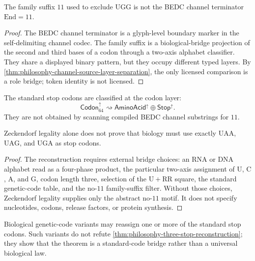 \begin{theorem}
\label{thm:philosophy-zstop-no-channel-token-collapse}
The family suffix $11$ used to exclude $\mathrm{UGG}$ is not the BEDC
channel terminator $\mathrm{End}=11$.
\end{theorem}
\begin{proof}
The BEDC channel terminator is a glyph-level boundary marker in the
self-delimiting channel codec. The family suffix is a biological-bridge
projection of the second and third bases of a codon through a two-axis
alphabet classifier. They share a displayed binary pattern, but they
occupy different typed layers. By
\autoref{thm:philosophy-channel-source-layer-separation}, the only
licensed comparison is a role bridge; token identity is not licensed.
\end{proof}

\begin{corollary}
\label{cor:philosophy-stop-codons-classifier-level}
The standard stop codons are classified at the codon layer:
$$
  \mathsf{Codon}_{64}^{\uparrow}
  \rightsquigarrow
  \mathsf{AminoAcid}^{\uparrow}\oplus\mathsf{Stop}^{\uparrow}.
$$
They are not obtained by scanning compiled BEDC channel substrings for
$11$.
\end{corollary}

\begin{theorem}
\label{thm:philosophy-zeckendorf-not-biological-necessity}
Zeckendorf legality alone does not prove that biology must use exactly
$\mathrm{UAA}$, $\mathrm{UAG}$, and $\mathrm{UGA}$ as stop codons.
\end{theorem}
\begin{proof}
The reconstruction requires external bridge choices: an RNA or DNA
alphabet read as a four-phase product, the particular two-axis
assignment of $\mathrm{U}$, $\mathrm{C}$, $\mathrm{A}$, and
$\mathrm{G}$, codon length three, selection of the
$\mathrm{U}+\mathrm{RR}$ square, the standard genetic-code table, and
the no-$11$ family-suffix filter. Without those choices, Zeckendorf
legality supplies only the abstract no-$11$ motif. It does not specify
nucleotides, codons, release factors, or protein synthesis.
\end{proof}

\begin{corollary}
\label{cor:philosophy-variant-codes-remain-targets}
Biological genetic-code variants may reassign one or more of the
standard stop codons. Such variants do not refute
\autoref{thm:philosophy-three-stop-reconstruction}; they show that the
theorem is a standard-code bridge rather than a universal biological
law.
\end{corollary}


